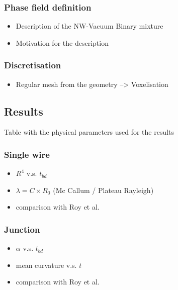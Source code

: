         \subsubsection{Phase field definition}
        \begin{itemize}
            \item Description of the NW-Vacuum Binary mixture
            \item Motivation for the description
        \end{itemize}
        \subsubsection{Discretisation}
        \begin{itemize}
            \item Regular mesh from the geometry --> Voxelisation
        \end{itemize}
    \subsection{Results}
        Table with the physical parameters used for the results
        \subsubsection{Single wire}
        \begin{itemize}
            \item $R^4$ v.s. $t_{bd}$
            \item $\lambda = C \times R_0$ (Mc Callum / Plateau Rayleigh)
            \item comparison with Roy et al.
        \end{itemize}
        \subsubsection{Junction}
        \begin{itemize}
            \item $\alpha$ v.s. $t_{bd}$
            \item mean curvature v.s. $t$
            \item comparison with Roy et al.
        \end{itemize}
    